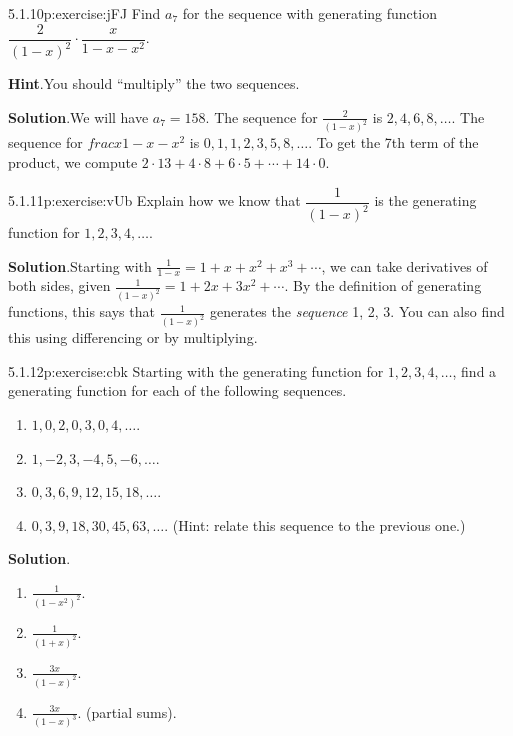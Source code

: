 \documentclass[twoside,11pt,]{book}
\newcommand{\blocktitlefont}{\relax}
\numberwithin{equation}{chapter}
\begin{document}
\begin{divisionsolution}{5.1.10}{}{p:exercise:jFJ}%
Find \(a_7\) for the sequence with generating function \(\dfrac{2}{(1-x)^2}\cdot\dfrac{x}{1-x-x^2}\).%
\par\smallskip%
\noindent\textbf{\blocktitlefont Hint}.\quad{}You should ``multiply'' the two sequences.%
\par\smallskip%
\noindent\textbf{\blocktitlefont Solution}.\quad{}We will have \(a_7 = 158\).  The sequence for \(\frac{2}{(1-x)^2}\) is \(2, 4, 6, 8, \ldots\).  The sequence for \(frac{x}{1-x-x^2}\) is \(0, 1, 1, 2, 3, 5, 8,\ldots\).  To get the 7th term of the product, we compute \(2\cdot 13 + 4 \cdot 8 + 6 \cdot 5 + \cdots + 14 \cdot 0\).%
\end{divisionsolution}%
\begin{divisionsolution}{5.1.11}{}{p:exercise:vUb}%
Explain how we know that \(\dfrac{1}{(1-x)^2}\) is the generating function for \(1, 2, 3, 4, \ldots\).%
\par\smallskip%
\noindent\textbf{\blocktitlefont Solution}.\quad{}Starting with \(\frac{1}{1-x} = 1 + x + x^2 + x^3 +\cdots\), we can take derivatives of both sides, given \(\frac{1}{(1-x)^2} = 1 + 2x + 3x^2 + \cdots\). By the definition of generating functions, this says that \(\frac{1}{(1-x)^2}\) generates the \emph{sequence} 1, 2, 3\textellipsis{}. You can also find this using differencing or by multiplying.%
\end{divisionsolution}%
\begin{divisionsolution}{5.1.12}{}{p:exercise:cbk}%
Starting with the generating function for \(1,2,3,4, \ldots\), find a generating function for each of the following sequences.%
\begin{enumerate}[label=(\alph*)]
\item{}\(1, 0, 2, 0, 3, 0, 4,\ldots\).%
\item{}\(1, -2, 3, -4, 5, -6, \ldots\).%
\item{}\(0, 3, 6, 9, 12, 15, 18, \ldots\).%
\item{}\(0, 3, 9, 18, 30, 45, 63,\ldots\). (Hint: relate this sequence to the previous one.)%
\end{enumerate}
%
\par\smallskip%
\noindent\textbf{\blocktitlefont Solution}.\quad{}%
\begin{enumerate}[label=(\alph*)]
\item{}\(\frac{1}{(1-x^2)^2}\).%
\item{}\(\frac{1}{(1+x)^2}\).%
\item{}\(\frac{3x}{(1-x)^2}\).%
\item{}\(\frac{3x}{(1-x)^3}\). (partial sums).%
\end{enumerate}
%
\end{divisionsolution}%
\end{document}
